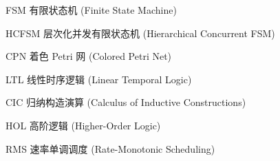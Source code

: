 \begin{denotation}[3cm]
\item[FSM] 有限状态机 (Finite State Machine)
\item[HCFSM] 层次化并发有限状态机 (Hierarchical Concurrent FSM)
\item[CPN] 着色 Petri 网 (Colored Petri Net)
\item[LTL] 线性时序逻辑 (Linear Temporal Logic)
\item[CIC] 归纳构造演算 (Calculus of Inductive Constructions)
\item[HOL] 高阶逻辑 (Higher-Order Logic)
\item[RMS] 速率单调调度 (Rate-Monotonic Scheduling)
\end{denotation}
